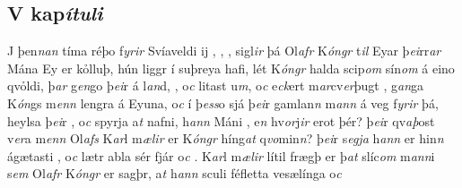 \beginnumbering \pstart  
\vspace{5mm}\subsection*{V kap\textit{ítuli}} 
J þen\textit{n}\textit{an} tíma réþo f\textit{yrir} Svíaveldi ij  ,   , , sigl\textit{ir} þá Ol\textit{afr} K\textit{óngr} t\textit{il} Eyar þ\textit{ei}rr\textit{ar}  Mána Ey er kỏlluþ, 
hún liggr í suþreya  hafi,  lét K\textit{óngr} halda scip\textit{om} sín\textit{om} á eino qvỏldi, þ\textit{ar} g\textit{en}go þ\textit{ei}r á l\textit{an}d,   , 
o\textit{c} litast u\textit{m}, o\textit{c}  e\textit{ck}ert   m\textit{ar}cv\textit{er}þugt  
 , 
g\textit{an}ga   K\textit{ón}gs m\textit{enn} lengra á Eyuna, o\textit{c} í þ\textit{ess}o
sjá þ\textit{ei}r   gamlan\textit{n} m\textit{ann}  á veg f\textit{yrir} þá, heylsa þ\textit{ei}r  , o\textit{c} spyrja  a\textit{t} nafni,   h\textit{ann}  Máni  , e\textit{n} hv\textit{or}j\textit{ir} erot þér? 
þ\textit{ei}r qv\textit{aþ}ost v\textit{er}a m\textit{enn} Ol\textit{afs}  K\textit{ar}l m\textit{ælir}  er   K\textit{óngr} híng\textit{at} q\textit{vo}min\textit{n}? þ\textit{ei}r
s\textit{egja} h\textit{ann} er hin\textit{n} ágætasti  , o\textit{c} lætr abla sér   fjár o\textit{c} . K\textit{ar}l m\textit{ælir} lítil frægþ er þ\textit{at} slíc\textit{om} m\textit{ann}i s\textit{em} Ol\textit{afr} K\textit{óngr} er  sagþr, a\textit{t} h\textit{ann} sculi    féfletta    vesælínga   o\textit{c}  
